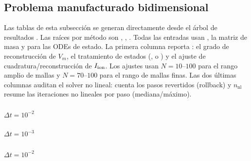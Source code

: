 \subsection{Problema manufacturado bidimensional}
\label{sec:es-results-2d}
Las tablas de esta subsección se generan directamente desde el árbol de
resultados . Las raíces por método son , , .
Todas las entradas usan , la matriz de masa
 y  para las ODEs de estado.
La primera columna reporta : el grado de reconstrucción
de $V_m$, el tratamiento de estados (,  o ) y el
ajuste de cuadratura/reconstrucción de $I_{\mathrm{ion}}$.
Los ajustes usan $N=10$--$100$ para el rango amplio de mallas y
$N=70$--$100$ para el rango de mallas finas.
Las dos últimas columnas auditan el solver no lineal:  cuenta los
pasos revertidos (rollback) y $n_{\mathrm{nl}}$ resume las iteraciones no
lineales por paso (mediana/máximo).

\subsubsection{}
\paragraph{$\Delta t=10^{-2}$}

\paragraph{$\Delta t=10^{-3}$}


\subsubsection{}
\paragraph{$\Delta t=10^{-2}$}

